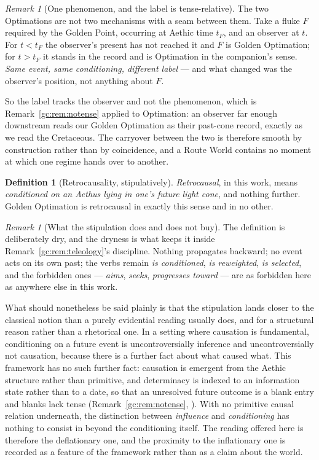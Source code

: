 \documentclass[11pt]{article}
\numberwithin{equation}{section}
\theoremstyle{plain}
\theoremstyle{definition}
\newtheorem{definition}[theorem]{Definition}
\theoremstyle{remark}
\newtheorem{remark}[theorem]{Remark}
\begin{document}
\begin{remark}[One phenomenon, and the label is tense-relative]
\label{gc:rem:carryover}
The two Optimations are not two mechanisms with a seam between them.
Take a fluke $F$ required by the Golden Point, occurring at Aethic time
$t_F$, and an observer at $t$. For $t<t_F$ the observer's present has not
reached it and $F$ is Golden Optimation; for $t>t_F$ it stands in the
record and is Optimation in the companion's sense. \emph{Same event, same
conditioning, different label} --- and what changed was the observer's
position, not anything about $F$.

So the label tracks the observer and not the phenomenon, which is
Remark~\ref{gc:rem:notense} applied to Optimation: an observer far enough
downstream reads our Golden Optimation as their past-cone record,
exactly as we read the Cretaceous. The carryover between the two is
therefore smooth by construction rather than by coincidence, and a Route
World contains no moment at which one regime hands over to another.
\end{remark}

\begin{definition}[Retrocausality, stipulatively]\label{gc:def:retrocausal}
\emph{Retrocausal}, in this work, means \emph{conditioned on an Aethus
lying in one's future light cone}, and nothing further. Golden
Optimation is retrocausal in exactly this sense and in no other.
\end{definition}

\begin{remark}[What the stipulation does and does not buy]
\label{gc:rem:retrocaution}
The definition is deliberately dry, and the dryness is what keeps it
inside Remark~\ref{gc:rem:teleology}'s discipline. Nothing propagates
backward; no event acts on its own past; the verbs remain \emph{is
conditioned}, \emph{is reweighted}, \emph{is selected}, and the
forbidden ones --- \emph{aims}, \emph{seeks}, \emph{progresses toward}
--- are as forbidden here as anywhere else in this work.

What should nonetheless be said plainly is that the stipulation lands
closer to the classical notion than a purely evidential reading usually
does, and for a structural reason rather than a rhetorical one. In a
setting where causation is fundamental, conditioning on a future event
is uncontroversially inference and uncontroversially not causation,
because there is a further fact about what caused what. This framework
has no such further fact: causation is emergent from the Aethic
structure rather than primitive, and determinacy is indexed to an
information state rather than to a date, so that an unresolved future
outcome is a blank entry and blanks lack tense
(Remark~\ref{gc:rem:notense}, \cite{AethusDecision}). With no primitive
causal relation underneath, the distinction between \emph{influence} and
\emph{conditioning} has nothing to consist in beyond the conditioning
itself. The reading offered here is therefore the deflationary one, and
the proximity to the inflationary one is recorded as a feature of the
framework rather than as a claim about the world.
\end{remark}
\end{document}
